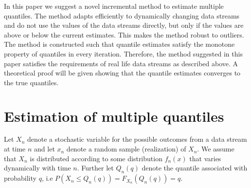 \documentclass[10pt, a4paper]{article}
\newtheorem{rational for conjecture}{Rational for Conjecture}
\begin{document}
In this paper we suggest a novel incremental method to estimate multiple quantiles. The method adapts efficiently to dynamically changing data streams and do not use the values of the data streams directly, but only if the values are above or below the current estimates. This makes the method robust to outliers. The method is constructed such that quantile estimates satisfy the monotone property of quantiles in every iteration. Therefore, the method suggested in this paper satisfies the requirements of real life data streams as described above. A theoretical proof will be given showing that the quantile estimates converges to the true quantiles.


\section{Estimation of multiple quantiles}
\label{sec:multq}

Let $X_n$ denote a stochastic variable for the possible outcomes
from a data stream at time $n$ and let $x_n$ denote a random sample (realization) of $X_n$.
 We assume that $X_n$ is distributed according to some distribution $f_n(x)$ that varies dynamically with time $n$.
 Further let $Q_{n}(q)$ denote the quantile associated with probability $q$, i.e $P(X_n \leq Q_n(q)) = F_{X_n}(Q_n(q)) = q$.
\end{document}
